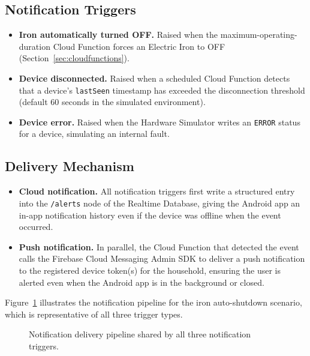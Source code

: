 \documentclass[11pt,a4paper]{article}
\begin{document}
\subsection{Notification Triggers}
\begin{itemize}
    \item \textbf{Iron automatically turned OFF.} Raised when the maximum-operating-duration Cloud Function forces an Electric Iron to OFF (Section~\ref{sec:cloudfunctions}).
    \item \textbf{Device disconnected.} Raised when a scheduled Cloud Function detects that a device's \texttt{lastSeen} timestamp has exceeded the disconnection threshold (default 60 seconds in the simulated environment).
    \item \textbf{Device error.} Raised when the Hardware Simulator writes an \texttt{ERROR} status for a device, simulating an internal fault.
\end{itemize}

\subsection{Delivery Mechanism}
\begin{itemize}
    \item \textbf{Cloud notification.} All notification triggers first write a structured entry into the \texttt{/alerts} node of the Realtime Database, giving the Android app an in-app notification history even if the device was offline when the event occurred.
    \item \textbf{Push notification.} In parallel, the Cloud Function that detected the event calls the Firebase Cloud Messaging Admin SDK to deliver a push notification to the registered device token(s) for the household, ensuring the user is alerted even when the Android app is in the background or closed.
\end{itemize}

Figure~\ref{fig:notification-flow} illustrates the notification pipeline for the iron auto-shutdown scenario, which is representative of all three trigger types.

\begin{figure}[H]
\centering
{}
\caption{Notification delivery pipeline shared by all three notification triggers.}
\label{fig:notification-flow}
\end{figure}
\end{document}
